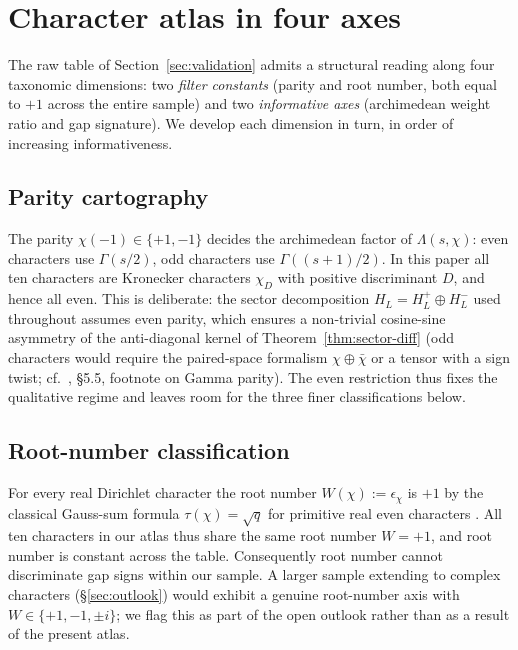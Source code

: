 \documentclass[10pt,twocolumn]{article}
\theoremstyle{definition}
\theoremstyle{remark}
\newcommand{\chifn}{\chi}
\begin{document}
\section{Character atlas in four axes}
\label{sec:atlas}

The raw table of Section~\ref{sec:validation} admits a structural
reading along four taxonomic dimensions: two \emph{filter constants}
(parity and root number, both equal to $+1$ across the entire sample)
and two \emph{informative axes} (archimedean weight ratio and gap
signature). We develop each dimension in turn, in order of increasing
informativeness.

\subsection{Parity cartography}
\label{sec:parity}

The parity $\chifn(-1)\in\{+1,-1\}$ decides the archimedean factor of
$\Lambda(s,\chifn)$: even characters use $\Gamma(s/2)$, odd
characters use $\Gamma((s+1)/2)$. In this paper all ten characters
are Kronecker characters $\chifn_D$ with positive discriminant $D$, and
hence all even. This is deliberate: the sector decomposition
$H_L=H_L^+\oplus H_L^-$ used throughout assumes even parity, which
ensures a non-trivial cosine-sine asymmetry of the anti-diagonal
kernel of Theorem~\ref{thm:sector-diff} (odd characters would
require the paired-space formalism
$\chifn\oplus\bar\chifn$ or a tensor with a sign twist; cf.\
\cite{MetaGalerkinBridge}, \S5.5, footnote on Gamma parity). The
even restriction thus fixes the qualitative regime and leaves room
for the three finer classifications below.

\subsection{Root-number classification}
\label{sec:rootnumber}

For every real Dirichlet character the root number $W(\chifn):=
\epsilon_{\chifn}$ is $+1$ by the classical Gauss-sum formula
$\tau(\chifn)=\sqrt{q}$ for primitive real even characters
\cite{IwaniecKowalski}. All ten characters in our atlas thus share the
same root number $W=+1$, and root number is constant across the
table. Consequently root number cannot discriminate gap signs
within our sample. A larger sample extending to complex
characters (\S\ref{sec:outlook}) would exhibit a genuine root-number
axis with $W\in\{+1,-1,\pm i\}$; we flag this as part of the open
outlook rather than as a result of the present atlas.
\end{document}

